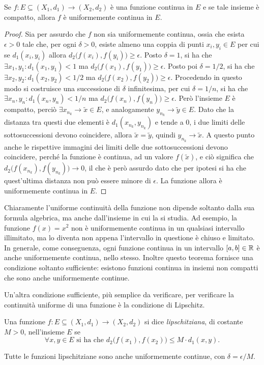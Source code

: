 \begin{teorema}
\label{t:heine-cantor}
Se $f\colon E\subseteq (X_1,d_1)\to(X_2,d_2)$ è una funzione continua in $E$ e se tale insieme è compatto, allora $f$ è uniformemente continua in $E$.
\end{teorema}
\begin{proof}
Sia per assurdo che $f$ non sia uniformemente continua, ossia che esista $\epsilon>0$ tale che, per ogni $\delta>0$, esiste almeno una coppia di punti $x_i,y_i\in E$ per cui se $d_1(x_i,y_i)$ allora $d_2\big(f(x_i),f(y_i)\big)\geq\epsilon$.
Posto $\delta=1$, si ha che $\exists x_1,y_1\colon d_1(x_1,y_1)<1$ ma $d_2\big(f(x_1),f(y_1)\big)\geq\epsilon$. Posto poi $\delta=1/2$, si ha che $\exists x_2,y_2\colon d_1(x_2,y_2)<1/2$ ma $d_2\big(f(x_2),f(y_2)\big)\geq\epsilon$. Procedendo in questo modo si costruisce una successione di $\delta$ infinitesima, per cui $\delta=1/n$, si ha che $\exists x_n,y_n\colon d_1(x_n,y_n)<1/n$ ma $d_2\big(f(x_n),f(y_n)\big)\geq\epsilon$. Però l'insieme $E$ è compatto, perciò $\exists x_{n_k}\to\tilde{x}\in E$, e analogamente $y_{n_k}\to\tilde{y}\in E$. Dato che la distanza tra questi due elementi è $d_1(x_{n_k},y_{n_k})$ e tende a 0, i due limiti delle sottosuccessioni devono coincidere, allora $\tilde{x}=\tilde{y}$, quindi $y_{n_k}\to\tilde{x}$. A questo punto anche le rispettive immagini dei limiti delle due sottosuccessioni devono coincidere, perché la funzione è continua, ad un valore $f(\tilde{x})$, e ciò significa che $d_2\big(f(x_{n_k}),f(y_{n_k})\big)\to 0$, il che è però assurdo dato che per ipotesi si ha che quest'ultima distanza non può essere minore di $\epsilon$. La funzione allora è uniformemente continua in $E$.
\end{proof}
Chiaramente l'uniforme continuità della funzione non dipende soltanto dalla sua formula algebrica, ma anche dall'insieme in cui la si studia. Ad esempio, la funzione $f(x)=x^2$ non è uniformemente continua in un qualsiasi intervallo illimitato, ma lo diventa non appena l'intervallo in questione è chiuso e limitato. In generale, come conseguenza, ogni funzione continua in un intervallo $[a,b]\in\mathbb{R}$ è anche uniformemente continua, nello stesso.
Inoltre questo teorema fornisce una condizione soltanto sufficiente: esistono funzioni continua in insiemi non compatti che sono anche uniformemente continue.

Un'altra condizione sufficiente, più semplice da verificare, per verificare la continuità uniforme di una funzione è la condizione di Lipschitz.
\begin{definizione}
\label{d:lipschitz}
Una funzione $f\colon E\subseteq (X_1,d_1)\to(X_2,d_2)$ si dice \emph{lipschitziana}, di costante $M>0$, nell'insieme $E$ se
\[
\forall x,y\in E\text{ si ha che }d_2\big(f(x_1),f(x_2)\big)\leq M\cdot d_1(x,y).
\]
\end{definizione}
Tutte le funzioni lipschitziane sono anche uniformemente continue, con $\delta=\epsilon/M$.

